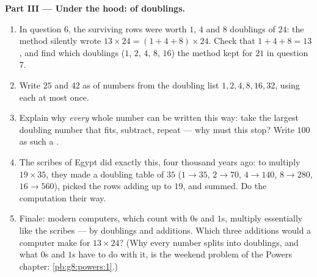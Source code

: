 \begin{problem}
\medskip
\noindent\textbf{Part III --- Under the hood:  of
doublings.}
\begin{enumerate}[resume]
  \item In question 6, the surviving rows were worth $1$, $4$
        and $8$ doublings of $24$: the method silently wrote
        $13 \times 24 = (1 + 4 + 8) \times 24$. Check that
        $1 + 4 + 8 = 13$, and find which doublings ($1$, $2$,
        $4$, $8$, $16$) the method kept for $21$ in question 7.
  \item Write $25$ and $42$ as  of numbers from the doubling
        list $1, 2, 4, 8, 16, 32$, using each at most once.
  \item Explain why \emph{every} whole number can be written
        this way: take the largest doubling number that fits,
        subtract, repeat --- why must this stop? Write $100$ as
        such a .
  \item The scribes of Egypt did exactly this, four thousand
        years ago: to multiply $19 \times 35$, they made a
        doubling table of $35$ ($1 \to 35$, $2 \to 70$,
        $4 \to 140$, $8 \to 280$, $16 \to 560$), picked the rows
        adding up to $19$, and summed. Do the computation their
        way.
  \item Finale: modern computers, which count with $0$s and
        $1$s, multiply essentially like the scribes --- by
        doublings and additions. Which three additions would a
        computer make for $13 \times 24$? (Why every number
        splits into doublings, and what $0$s and $1$s have to do
        with it, is the weekend problem of the Powers chapter:
        \cref{pb:g8:powers:1}.)
\end{enumerate}
\end{problem}
